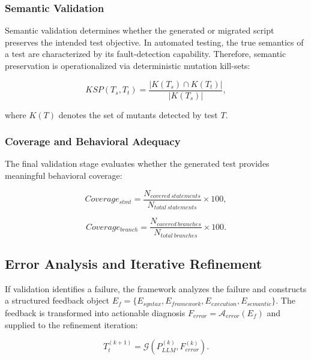 \documentclass[pdflatex,sn-mathphys-num]{sn-jnl}
\begin{document}
\subsubsection{Semantic Validation}

Semantic validation determines whether the generated or migrated script
preserves the intended test objective. In automated testing, the true
semantics of a test are characterized by its fault-detection capability.
Therefore, semantic preservation is operationalized via deterministic
mutation kill-sets:

\begin{equation}
    KSP(T_s, T_t)
    =
    \frac{|K(T_s) \cap K(T_t)|}{|K(T_s)|},
\label{eq:ksp-metric}
\end{equation}

where $K(T)$ denotes the set of mutants detected by test $T$.

\subsubsection{Coverage and Behavioral Adequacy}

The final validation stage evaluates whether the generated test provides
meaningful behavioral coverage:

\begin{equation}
    Coverage_{stmt}
    =
    \frac{N_{covered\ statements}}{N_{total\ statements}} \times 100,
\label{eq:statement-coverage}
\end{equation}

\begin{equation}
    Coverage_{branch}
    =
    \frac{N_{covered\ branches}}{N_{total\ branches}} \times 100.
\label{eq:branch-coverage}
\end{equation}

\subsection{Error Analysis and Iterative Refinement}
\label{subsec:error-refinement}

If validation identifies a failure, the framework analyzes the failure and
constructs a structured feedback object $E_f = \{E_{syntax}, E_{framework}, E_{execution}, E_{semantic}\}$.
The feedback is transformed into actionable diagnosis $F_{error} = \mathcal{A}_{error}(E_f)$
and supplied to the refinement iteration:

\begin{equation}
    T_t^{(k+1)}
    =
    \mathcal{G}
    (
        P_{LLM}^{(k)},
        F_{error}^{(k)}
    ).
\label{eq:iterative-generation}
\end{equation}
\end{document}
